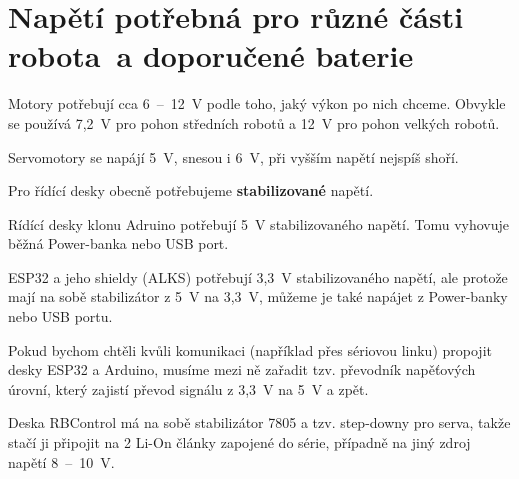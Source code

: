 \section{Napětí potřebná pro různé části robota~a doporučené baterie}


Motory potřebují cca 6~--~12~V podle toho, jaký výkon po nich chceme. 
Obvykle se používá 7,2~V pro pohon středních robotů a 12~V pro pohon velkých robotů. 

Servomotory se napájí 5~V, snesou i 6~V, při vyšším napětí nejspíš shoří.  

Pro řídící desky obecně potřebujeme {\bf stabilizované} napětí.   

Rídící desky klonu Adruino potřebují 5~V stabilizovaného napětí. Tomu vyhovuje běžná Power-banka nebo USB port. 


ESP32 a jeho shieldy (ALKS) potřebují 3,3~V stabilizovaného napětí, ale protože mají na sobě stabilizátor z 5~V na 3,3~V, můžeme je také napájet z Power-banky nebo USB portu. 


Pokud bychom chtěli kvůli komunikaci (například přes sériovou linku) propojit desky ESP32 a Arduino, musíme mezi ně zařadit tzv. převodník napěťových úrovní, který zajistí převod signálu z 3,3~V na 5~V a zpět.  


Deska RBControl má na sobě stabilizátor 7805 a tzv. step-downy  pro serva, takže stačí ji připojit na 2 Li-On články zapojené do série, případně na jiný zdroj napětí 8~--~10~V.      %










